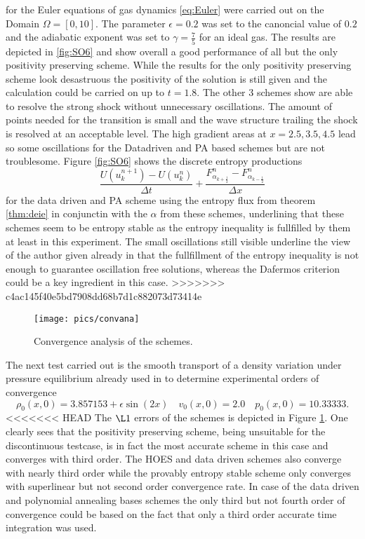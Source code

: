 	for the Euler equations of gas dynamics \ref{eq:Euler} were carried out on the Domain $\Omega = [0, 10]$. The parameter $\epsilon = 0.2$ was set to the canoncial value of $0.2$ and the adiabatic exponent was set to $\gamma=\frac 7 5$ for an ideal gas. The results are depicted in \ref{fig:SO6} and show overall a good performance of all but the only positivity preserving scheme. While the results for the only positivity preserving scheme look desastruous the positivity of the solution is still given and the calculation could be carried on up to $t = 1.8$. The other 3 schemes show are able to resolve the strong shock without unnecessary oscillations. The amount of points needed for the transition is small and the wave structure trailing the shock is resolved at an acceptable level. The high gradient areas at $x=2.5, 3.5, 4.5$ lead so some oscillations for the Datadriven and PA based schemes but are not troublesome. Figure \ref{fig:SO6} shows the discrete entropy productions 
	\[
		\frac{U(u^{n+1}_k) - U(u^n_k)}{\Delta t} + \frac{F^n_{\alpha_{k + \frac 1 2}} - F^n_{\alpha_{k - \frac 1 2}}}{\Delta x}
	\]
	for the data driven and PA scheme using the entropy flux from theorem  \ref{thm:deie} in conjunctin with the $\alpha$ from these schemes, underlining that these schemes seem to be entropy stable as the entropy inequality is fullfilled by them at least in this experiment. The small oscillations still visible underline the view of the author given already in \cite{klein2021using} that the fullfillment of the entropy inequality is not enough to guarantee oscillation free solutions, whereas the Dafermos criterion could be a key ingredient in this case. 
>>>>>>> c4ac145f40e5bd7908dd68b7d1c882073d73414e
	\begin{figure}
		\texttt{[image: pics/convana]}
		\caption{Convergence analysis of the schemes.}
		\label{fig:CA}
	\end{figure}
	The next test carried out is the smooth transport of a density variation under pressure equilibrium already used in \cite{klein2021using} to determine experimental orders of convergence
	\[
	\rho_0(x, 0) = 3.857153 + \epsilon \sin(2 x)  \quad v_0(x, 0) =  2.0 \quad p_0(x, 0) = 10.33333.
	\]
<<<<<<< HEAD
	The $\L1$ errors of the schemes is depicted in Figure \ref{fig:CA}. One clearly sees that the positivity preserving scheme, being unsuitable for the discontinuous testcase, is in fact the most accurate scheme in this case and converges with third order. The HOES and data driven schemes also converge with nearly third order while the provably entropy stable scheme only converges with superlinear but not second order convergence rate. In case of the data driven and polynomial annealing bases schemes the only third but not fourth order of convergence could be based on the fact that only a third order accurate time integration was used.
